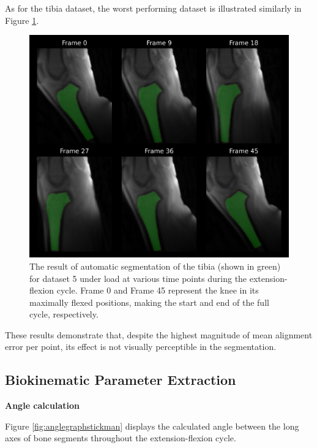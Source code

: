 \documentclass{micro-econ-thesis}
\begin{document}
As for the tibia dataset, the worst performing dataset is illustrated similarly in Figure \ref{fig:d7wtib}. 

\begin{figure} [H]
	\centering
	\includegraphics[width=0.7\linewidth]{d7_W_tib}
	\caption{ The result of automatic segmentation of the tibia (shown in green) for dataset 5 under load at various time points during the extension-flexion cycle. Frame 0 and Frame 45 represent the knee in its maximally flexed positions, making the start and end of the full cycle, respectively.}
	\label{fig:d7wtib}
\end{figure}
 
These results demonstrate that, despite the highest magnitude of mean alignment error per point, its effect is not visually perceptible in the segmentation.   

\subsection{Biokinematic Parameter Extraction}

\textbf{Angle calculation}

Figure \ref{fig:anglegraphstickman} displays the calculated angle between the long axes of bone segments throughout the extension-flexion cycle. 
 
\end{document}
